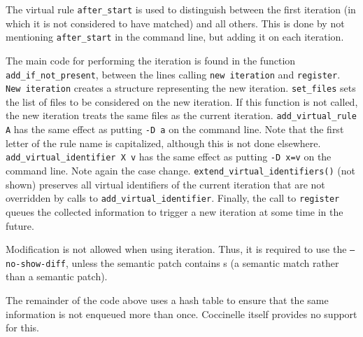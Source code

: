 The virtual rule {\tt after\_start} is used to distinguish between the
first iteration (in which it is not considered to have matched) and all
others.  This is done by not mentioning {\tt after\_start} in the command
line, but adding it on each iteration.

The main code for performing the iteration is found in the function {\tt
  add\_if\_not\_present}, between the lines calling {\tt new iteration} and
{\tt register}.  {\tt New iteration} creates a structure representing the
new iteration.  {\tt set\_files} sets the list of files to be considered on
the new iteration.  If this function is not called, the new iteration
treats the same files as the current iteration.  {\tt add\_virtual\_rule A}
has the same effect as putting {\tt -D a} on the command line.  Note that
the first letter of the rule name is capitalized, although this is not done
elsewhere.  {\tt add\_virtual\_identifier X v} has the same effect as
putting {\tt -D x=v} on the command line.  Note again the case change.
{\tt extend\_virtual\_identifiers()} (not shown) preserves all virtual
identifiers of the current iteration that are not overridden by calls to 
{\tt add\_virtual\_identifier}.  Finally, the call to {\tt register} queues
the collected information to trigger a new iteration at some time in the
future.

Modification is not allowed when using iteration.  Thus, it is required to
use the {\tt --no-show-diff}, unless the semantic patch contains {\tt *}s
(a semantic match rather than a semantic patch).

The remainder of the code above uses a hash table to ensure that the same
information is not enqueued more than once.  Coccinelle itself provides no
support for this.

